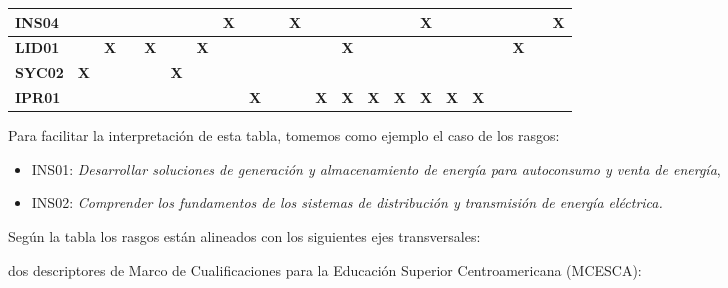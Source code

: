 \begin{center}
\begin{adjustbox}{max width=\textwidth,max totalheight=.82\textheight}
\begin{tabular}{|l|c|c|c|c|c|c|c|c|c|c|c|c|c|c|c|c|c|c|c|c|c|}
\rowcolor{azulClaro}
\textcolor{azulTEC}{\textbf{INS04}} & \textbf{ } & \textbf{ } & \textbf{ } & \textbf{ } & \textbf{ } & \textbf{ } & \textbf{X} & \textbf{ } & \textbf{ } & \textbf{X} & \textbf{ } & \textbf{ } & \textbf{ } & \textbf{ } & \textbf{X} & \textbf{ } & \textbf{ } & \textbf{ } & \textbf{ } & \textbf{ } & \textbf{X} \\ \hline
\rowcolor{azulClaro}
\textcolor{azulTEC}{\textbf{LID01}} & \textbf{ } & \textbf{X} & \textbf{ } & \textbf{X} & \textbf{ } & \textbf{X} & \textbf{ } & \textbf{ } & \textbf{ } & \textbf{ } & \textbf{ } & \textbf{X} & \textbf{ } & \textbf{ } & \textbf{ } & \textbf{ } & \textbf{ } & \textbf{ } & \textbf{X} & \textbf{ } & \textbf{ } \\ \hline
\rowcolor{azulClaro}
\textcolor{azulTEC}{\textbf{SYC02}} & \textbf{X} & \textbf{ } & \textbf{ } & \textbf{ } & \textbf{X} & \textbf{ } & \textbf{ } & \textbf{ } & \textbf{ } & \textbf{ } & \textbf{ } & \textbf{ } & \textbf{ } & \textbf{ } & \textbf{ } & \textbf{ } & \textbf{ } & \textbf{ } & \textbf{ } & \textbf{ } & \textbf{ } \\ \hline
\rowcolor{azulClaro}
\textcolor{azulTEC}{\textbf{IPR01}} & \textbf{ } & \textbf{ } & \textbf{ } & \textbf{ } & \textbf{ } & \textbf{ } & \textbf{ } & \textbf{X} & \textbf{ } & \textbf{ } & \textbf{X} & \textbf{X} & \textbf{X} & \textbf{X} & \textbf{X} & \textbf{X} & \textbf{X} & \textbf{ } & \textbf{ } & \textbf{ } & \textbf{ } \\ \hline
\end{tabular}
\end{adjustbox}
\end{center}

Para facilitar la interpretación de esta tabla, tomemos como ejemplo el caso de los rasgos:\par

\begin{itemize}
\item INS01: \textit{Desarrollar soluciones de generación y almacenamiento de energía para autoconsumo y venta de energía},
\item INS02: \textit{Comprender los fundamentos de los sistemas de distribución y transmisión de energía eléctrica}\textit{.}
\end{itemize}
Según la tabla los rasgos están alineados con los siguientes ejes transversales:\par

dos descriptores de Marco de Cualificaciones para la Educación Superior Centroamericana (MCESCA):\par

